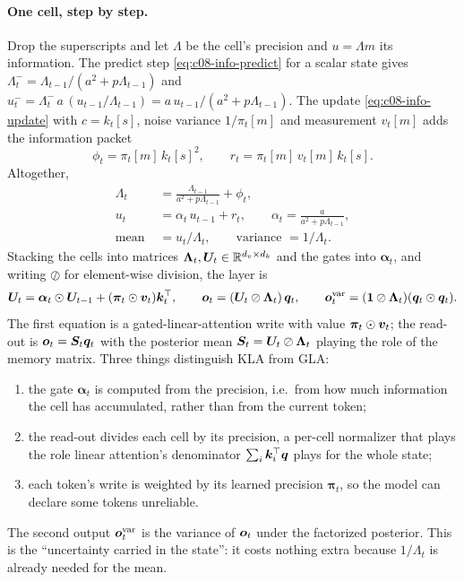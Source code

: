 \paragraph{One cell, step by step.} Drop the superscripts and let $\Lambda$ be the cell's
precision and $u=\Lambda m$ its information. The predict step \eqref{eq:c08-info-predict} for a
scalar state gives $\Lambda_t^-=\Lambda_{t-1}/(a^2+p\Lambda_{t-1})$ and
$u_t^-=\Lambda_t^-\,a\,(u_{t-1}/\Lambda_{t-1})=a\,u_{t-1}/(a^2+p\Lambda_{t-1})$. The update
\eqref{eq:c08-info-update} with $c=k_t[s]$, noise variance $1/\pi_t[m]$ and measurement $v_t[m]$
adds the information packet
\begin{equation}\label{eq:c08-kla-stats}
  \phi_t = \pi_t[m]\,k_t[s]^2,\qquad r_t=\pi_t[m]\,v_t[m]\,k_t[s].
\end{equation}
Altogether,
\begin{align}
  \Lambda_t &= \frac{\Lambda_{t-1}}{a^2+p\Lambda_{t-1}}+\phi_t, \label{eq:c08-kla-prec}\\
  u_t &= \alpha_t\,u_{t-1}+r_t,\qquad \alpha_t=\frac{a}{a^2+p\Lambda_{t-1}}, \label{eq:c08-kla-info}\\
  \text{mean } &= u_t/\Lambda_t,\qquad \text{variance } = 1/\Lambda_t . \nonumber
\end{align}
Stacking the cells into matrices $\bm{\Lambda}_t,\bm{U}_t\in\mathbb{R}^{d_v\times d_k}$ and the gates into
$\bm{\alpha}_t$, and writing $\oslash$ for element-wise division, the layer is
\begin{equation}\label{eq:c08-kla-matrix}
  \bm{U}_t=\bm{\alpha}_t\odot\bm{U}_{t-1}+(\bm{\pi}_t\odot\bm{v}_t)\bm{k}_t^{\top},\qquad
  \bm{o}_t=(\bm{U}_t\oslash\bm{\Lambda}_t)\,\bm{q}_t,\qquad
  \bm{o}^{\mathrm{var}}_t=(\bm{1}\oslash\bm{\Lambda}_t)(\bm{q}_t\odot\bm{q}_t).
\end{equation}
The first equation is a gated-linear-attention write with value $\bm{\pi}_t\odot\bm{v}_t$; the read-out
is $\bm{o}_t=\bm{S}_t\bm{q}_t$ with the posterior mean $\bm{S}_t=\bm{U}_t\oslash\bm{\Lambda}_t$ playing the role of the
memory matrix. Three things distinguish KLA from GLA:
\begin{enumerate}
  \item the gate $\bm{\alpha}_t$ is computed from the precision, i.e.\ from how much information the
  cell has accumulated, rather than from the current token;
  \item the read-out divides each cell by its precision, a per-cell normalizer that plays the role
  linear attention's denominator $\sum_i\bm{k}_i^{\top}\bm{q}$ plays for the whole state;
  \item each token's write is weighted by its learned precision $\bm{\pi}_t$, so the model can
  declare some tokens unreliable.
\end{enumerate}
The second output $\bm{o}^{\mathrm{var}}_t$ is the variance of $\bm{o}_t$ under the factorized posterior.
This is the ``uncertainty carried in the state'': it costs nothing extra because $1/\Lambda_t$ is
already needed for the mean.

